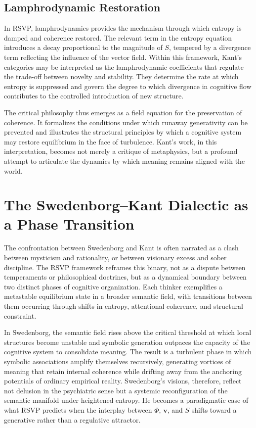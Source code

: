 \documentclass[12pt]{article}
\begin{document}
\subsection{Lamphrodynamic Restoration}

In RSVP, lamphrodynamics provides the mechanism through which entropy is 
damped and coherence restored. The relevant term in the entropy equation 
introduces a decay proportional to the magnitude of $S$, tempered by a 
divergence term reflecting the influence of the vector field. Within this 
framework, Kant’s categories may be interpreted as the lamphrodynamic 
coefficients that regulate the trade-off between novelty and stability.  
They determine the rate at which entropy is suppressed and govern the degree 
to which divergence in cognitive flow contributes to the controlled 
introduction of new structure.

The critical philosophy thus emerges as a field equation for the preservation 
of coherence. It formalizes the conditions under which runaway generativity 
can be prevented and illustrates the structural principles by which a 
cognitive system may restore equilibrium in the face of turbulence. Kant’s 
work, in this interpretation, becomes not merely a critique of metaphysics, 
but a profound attempt to articulate the dynamics by which meaning remains 
aligned with the world.

\section{The Swedenborg--Kant Dialectic as a Phase Transition}

The confrontation between Swedenborg and Kant is often narrated as a clash 
between mysticism and rationality, or between visionary excess and sober 
discipline. The RSVP framework reframes this binary, not as a dispute between 
temperaments or philosophical doctrines, but as a dynamical boundary between 
two distinct phases of cognitive organization. Each thinker exemplifies a 
metastable equilibrium state in a broader semantic field, with transitions 
between them occurring through shifts in entropy, attentional coherence, and 
structural constraint.

In Swedenborg, the semantic field rises above the critical threshold at which 
local structures become unstable and symbolic generation outpaces the 
capacity of the cognitive system to consolidate meaning. The result is a 
turbulent phase in which symbolic associations amplify themselves recursively, 
generating vortices of meaning that retain internal coherence while drifting 
away from the anchoring potentials of ordinary empirical reality. Swedenborg's 
visions, therefore, reflect not delusion in the psychiatric sense but a 
systemic reconfiguration of the semantic manifold under heightened entropy. 
He becomes a paradigmatic case of what RSVP predicts when the interplay 
between $\Phi$, $\mathbf{v}$, and $S$ shifts toward a generative rather than 
a regulative attractor.
\end{document}
